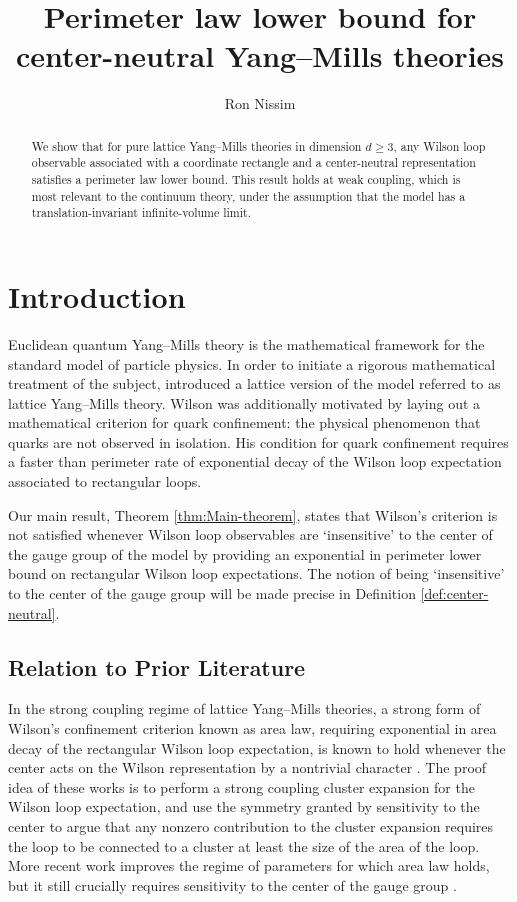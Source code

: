 \documentclass[reqno]{amsart}
\title{Perimeter law lower bound for center-neutral Yang--Mills theories}
\author{Ron Nissim}
\date{}
\begin{document}
\begin{abstract}
    We show that for pure lattice Yang--Mills theories in dimension $d\geq 3$, any Wilson loop observable associated with a coordinate rectangle and a center-neutral representation satisfies a perimeter law lower bound. This result holds at weak coupling, which is most relevant to the continuum theory, under the assumption that the model has a translation-invariant infinite-volume limit.
\end{abstract}

\maketitle

\tableofcontents

\section{Introduction}

Euclidean quantum Yang--Mills theory is the mathematical framework for the standard model of particle physics. In order to initiate a rigorous mathematical treatment of the subject, \cite{Wilson1974} introduced a lattice version of the model referred to as lattice Yang--Mills theory. Wilson was additionally motivated by laying out a mathematical criterion for quark confinement: the physical phenomenon that quarks are not observed in isolation. His condition for quark confinement requires a faster than perimeter rate of exponential decay of the Wilson loop expectation associated to rectangular loops. 

Our main result, Theorem \ref{thm:Main-theorem}, states that Wilson's criterion is not satisfied whenever Wilson loop observables are `insensitive' to the center of the gauge group of the model by providing an exponential in perimeter lower bound on rectangular Wilson loop expectations. The notion of being `insensitive' to the center of the gauge group will be made precise in Definition \ref{def:center-neutral}.

\subsection{Relation to Prior Literature}

In the strong coupling regime of lattice Yang--Mills theories, a strong form of Wilson's confinement criterion known as area law, requiring exponential in area decay of the rectangular Wilson loop expectation, is known to hold whenever the center acts on the Wilson representation by a nontrivial character \cite{osterwalderseiler1978,seiler1982gauge}. The proof idea of these works is to perform a strong coupling cluster expansion for the Wilson loop expectation, and use the symmetry granted by sensitivity to the center to argue that any nonzero contribution to the cluster expansion requires the loop to be connected to a cluster at least the size of the area of the loop. More recent work improves the regime of parameters for which area law holds, but it still crucially requires sensitivity to the center of the gauge group \cite{CNS2025a,CNS2025b}. 
\end{document}
